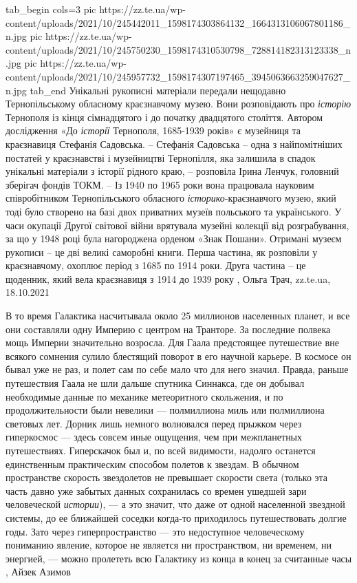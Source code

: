 \ifcmt
  tab_begin cols=3
     pic https://zz.te.ua/wp-content/uploads/2021/10/245442011_1598174303864132_1664313106067801186_n.jpg
     pic https://zz.te.ua/wp-content/uploads/2021/10/245750230_1598174310530798_728814182313123338_n.jpg
		 pic https://zz.te.ua/wp-content/uploads/2021/10/245957732_1598174307197465_3945063663259047627_n.jpg
  tab_end
\fi
Унікальні рукописні матеріали передали нещодавно Тернопільському обласному
краєзнавчому музею. Вони розповідають про \emph{історію} Тернополя із кінця
сімнадцятого і до початку двадцятого століття.  Автором дослідження «До
\emph{історії} Тернополя, 1685-1939 років» є музейниця та краєзнавиця Стефанія
Садовська.  – Стефанія Садовська – одна з найпомітніших постатей у краєзнавстві
і музейництві Тернопілля, яка залишила в спадок унікальні матеріали з історії
рідного краю, – розповіла Ірина Ленчук, головний зберігач фондів ТОКМ. – Із
1940 по 1965 роки вона працювала науковим співробітником Тернопільського
обласного \emph{історико}-краєзнавчого музею, який тоді було створено на базі
двох приватних музеїв польського та українського. У часи окупації Другої
світової війни врятувала музейні колекції від розграбування, за що у 1948 році
була нагороджена орденом «Знак Пошани».  Отримані музеєм рукописи – це дві
великі саморобні книги. Перша частина, як розповіли у краєзнавчому, охоплює
період з 1685 по 1914 роки. Друга частина – це щоденник, який вела краєзнавиця
з 1914 до 1939 року
, 
Ольга Трач, zz.te.ua, 18.10.2021

В то время Галактика насчитывала около 25 миллионов населенных планет, и все
они составляли одну Империю с центром на Транторе. За последние полвека мощь
Империи значительно возросла.  Для Гаала предстоящее путешествие вне всякого
сомнения сулило блестящий поворот в его научной карьере. В космосе он бывал уже
не раз, и полет сам по себе мало что для него значил. Правда, раньше
путешествия Гаала не шли дальше спутника Синнакса, где он добывал необходимые
данные по механике метеоритного скольжения, и по продолжительности были
невелики — полмиллиона миль или полмиллиона световых лет.  Дорник лишь немного
волновался перед прыжком через гиперкосмос — здесь совсем иные ощущения, чем
при межпланетных путешествиях. Гиперскачок был и, по всей видимости, надолго
останется единственным практическим способом полетов к звездам. В обычном
пространстве скорость звездолетов не превышает скорости света (только эта часть
давно уже забытых данных сохранилась со времен ушедшей зари человеческой
\emph{истории}), — а это значит, что даже от одной населенной звездной системы,
до ее ближайшей соседки когда-то приходилось путешествовать долгие годы. Зато
через гиперпространство — это недоступное человеческому пониманию явление,
которое не является ни пространством, ни временем, ни энергией, — можно
пролететь всю Галактику из конца в конец за считанные часы
, Айзек Азимов

